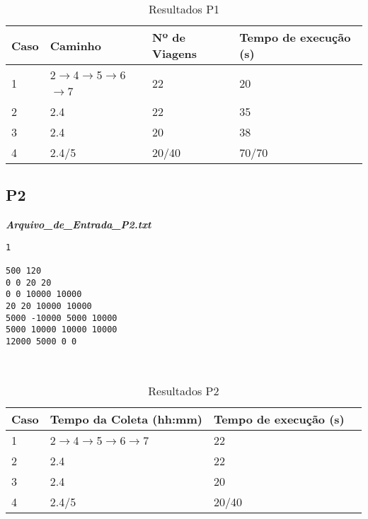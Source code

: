 \documentclass{article}
\begin{document}
\begin{table}[!ht]
\centering
\caption{Resultados P1 \label{Resultados-P1}}
\begin{tabular}{l l l l}
   \toprule
    \textsf{Caso}    & \textsf{Caminho} & \textsf{Nº de Viagens} &  \textsf{Tempo de execução (s)}\\
    
    \midrule \midrule
    1      & 2$\rightarrow$4$\rightarrow$5$\rightarrow$6$\rightarrow$7   & 22 & 20  \\
    
    2 & 2.4 & 22 & 35 \\
    
    
    3 & 2.4 & 20 & 38  \\
    
    4 & 2.4/5 & 20/40 & 70/70
    \\[1ex]
    \bottomrule
    \end{tabular}
     
\end{table}

\subsection{P2}

\begin{center} \textbf{\textit{Arquivo\_de\_Entrada\_P2.txt}} \end{center}
       \begin{lstlisting} 
1

500 120
0 0 20 20
0 0 10000 10000
20 20 10000 10000
5000 -10000 5000 10000
5000 10000 10000 10000
12000 5000 0 0

        
\end{lstlisting}

\begin{table}[!ht]
\centering
\caption{Resultados P2 \label{Resultados-P2}}
\begin{tabular}{l l l l}
   \toprule
    \textsf{Caso}    & \textsf{Tempo da Coleta (hh:mm)} & \textsf{Tempo de execução (s)}\\
    
    \midrule \midrule
    1      & 2$\rightarrow$4$\rightarrow$5$\rightarrow$6$\rightarrow$7   & 22   \\
    
    2 & 2.4 & 22 \\
    
    
    3 & 2.4 & 20 \\
    
    4 & 2.4/5 & 20/40 
    \\[1ex]
    \bottomrule
    \end{tabular}
     
\end{table}
\end{document}
